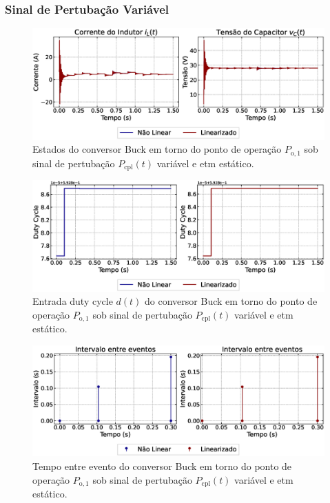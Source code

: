 \subsubsection{Sinal de Pertubação Variável}

\begin{figure}[H]
  \centering
  \captionsetup{justification=centering}
  \includegraphics[width=1.\textwidth]{figuras/dynamic-etm/buck/sim2/op1/result.eps}
  \caption{Estados do conversor Buck em torno do ponto de operação $P_{\mathrm{o}, 1}$ sob sinal de pertubação $P_{\mathrm{cpl}}(t)$ variável e \acrshort{etm} estático.}
\end{figure}

\begin{figure}[H]
  \centering
  \captionsetup{justification=centering}
  \includegraphics[width=1.\textwidth]{figuras/dynamic-etm/buck/sim2/op1/duty-cycle.eps}
  \caption{Entrada duty cycle $d(t)$ do conversor Buck em torno do ponto de operação $P_{\mathrm{o}, 1}$ sob sinal de pertubação $P_{\mathrm{cpl}}(t)$ variável e \acrshort{etm} estático.}
\end{figure}

\begin{figure}[H]
  \centering
  \captionsetup{justification=centering}
  \includegraphics[width=1.\textwidth]{figuras/dynamic-etm/buck/sim2/op1/inter-event-times.eps}
  \caption{Tempo entre evento do conversor Buck em torno do ponto de operação $P_{\mathrm{o}, 1}$ sob sinal de pertubação $P_{\mathrm{cpl}}(t)$ variável e \acrshort{etm} estático.}
\end{figure}

